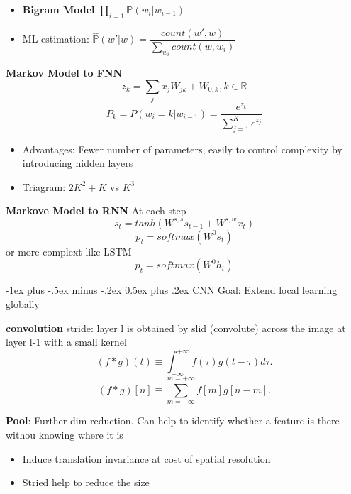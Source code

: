 \documentclass[a4paper, 10pt,landscape]{article}
\makeatletter
\renewcommand{\section}{\@startsection{section}{1}{0mm}%
                                {-1ex plus -.5ex minus -.2ex}%
                                {0.5ex plus .2ex}%
                                {\normalfont\large\bfseries}}
\makeatother
\begin{document}
\begin{multicols*}{3}
\begin{description}
\begin{itemize}
			\item {\bf Bigram Model} $\prod_{i=1} \mathbb{P}(w_i|w_{i-1})$
			\item ML estimation: $\widehat{\mathbb{P}}(w'|w) = \dfrac{count(w', w)}{\sum_{w_i} count(w, w_i)}$
		\end{itemize}
	\item {\bf Markov Model to FNN}
		$$z_k = \sum_j x_j W_{jk} + W_{0,k},   k \in \mathbb{R}$$
		$$P_k = P(w_i=k|w_{i-1}) = \dfrac{e^{z_k}}{\sum_{j=1}^K e^{z_j}}$$
		\begin{itemize}
			\item Advantages: Fewer number of parameters, easily to control complexity by introducing hidden layers
			\item Triagram: $2K^2+K$ vs $K^3$
		\end{itemize}
	\item {\bf Markove Model to RNN} At each step
		$$s_t = tanh(W^{s,s}s_{t-1} + W^{s,w}x_t)$$
		$$p_t = softmax(W^0 s_t)$$ or more complext like LSTM
		$$p_t = softmax(W^0 h_t)$$
 
\end{description}

\section{CNN}
Goal: Extend local learning globally
\begin{description}
	\item{\bf convolution} stride: layer l is obtained by slid (convolute) across the image at layer l-1 with a small kernel
		$$\left(f*g\right)(t)\equiv\int_{-\infty}^{+\infty}f(\tau)g(t-\tau)d\tau.$$
		$$\left(f*g\right)[n]\equiv\sum_{m=-\infty}^{m=+\infty}f[m]g[n-m].$$
	\item{\bf Pool}: Further dim reduction. Can help to identify whether a feature is there withou knowing where it is 
		\begin{itemize}
			\item Induce translation invariance at cost of spatial resolution
			\item Stried help to reduce the size 
		\end{itemize}
\end{description}




\end{multicols*}
\end{document}
